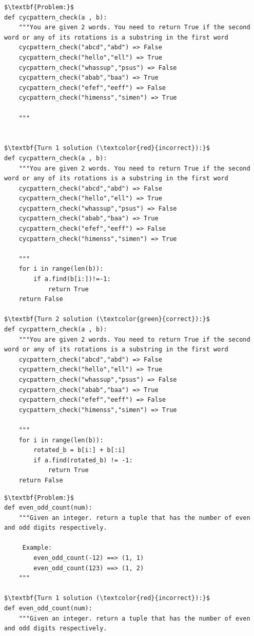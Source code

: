 \begin{appendix}
\begin{lstlisting}[title=HumanEval Example 1,mathescape=true]
$\textbf{Problem:}$
def cycpattern_check(a , b):
    """You are given 2 words. You need to return True if the second word or any of its rotations is a substring in the first word
    cycpattern_check("abcd","abd") => False
    cycpattern_check("hello","ell") => True
    cycpattern_check("whassup","psus") => False
    cycpattern_check("abab","baa") => True
    cycpattern_check("efef","eeff") => False
    cycpattern_check("himenss","simen") => True

    """


$\textbf{Turn 1 solution (\textcolor{red}{incorrect}):}$
def cycpattern_check(a , b):
    """You are given 2 words. You need to return True if the second word or any of its rotations is a substring in the first word
    cycpattern_check("abcd","abd") => False
    cycpattern_check("hello","ell") => True
    cycpattern_check("whassup","psus") => False
    cycpattern_check("abab","baa") => True
    cycpattern_check("efef","eeff") => False
    cycpattern_check("himenss","simen") => True

    """
    for i in range(len(b)):
        if a.find(b[i:])!=-1:
            return True
    return False

$\textbf{Turn 2 solution (\textcolor{green}{correct}):}$
def cycpattern_check(a , b):
    """You are given 2 words. You need to return True if the second word or any of its rotations is a substring in the first word
    cycpattern_check("abcd","abd") => False
    cycpattern_check("hello","ell") => True
    cycpattern_check("whassup","psus") => False
    cycpattern_check("abab","baa") => True
    cycpattern_check("efef","eeff") => False
    cycpattern_check("himenss","simen") => True

    """
    for i in range(len(b)):
        rotated_b = b[i:] + b[:i]
        if a.find(rotated_b) != -1:
            return True
    return False
\end{lstlisting}

\begin{lstlisting}[title=HumanEval Example 2,mathescape=true]
$\textbf{Problem:}$
def even_odd_count(num):
    """Given an integer. return a tuple that has the number of even and odd digits respectively.

     Example:
        even_odd_count(-12) ==> (1, 1)
        even_odd_count(123) ==> (1, 2)
    """

$\textbf{Turn 1 solution (\textcolor{red}{incorrect}):}$
def even_odd_count(num):
    """Given an integer. return a tuple that has the number of even and odd digits respectively.


\end{lstlisting}
\end{appendix}
